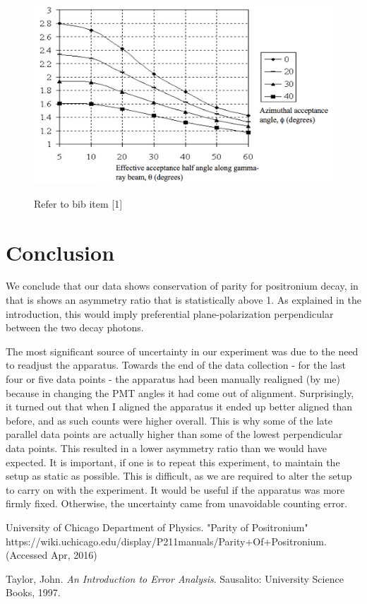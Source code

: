 \documentclass{article}
\begin{document}
\begin{figure}[!htb]
	\centering
	\includegraphics[scale=.2]{Fig_6.png}
 	\label{graph}
	\caption{Refer to bib item [1]}
\end{figure}

\newpage

\section{Conclusion}

We conclude that our data shows conservation of parity for positronium decay, in that is shows an asymmetry ratio that is statistically above 1. As explained in the introduction, this would imply preferential plane-polarization perpendicular between the two decay photons.

\hspace{.25cm}

The most significant source of uncertainty in our experiment was due to the need to readjust the apparatus. Towards the end of the data collection - for the last four or five data points - the apparatus had been manually realigned (by me) because in changing the PMT angles it had come out of alignment. Surprisingly, it turned out that when I aligned the apparatus it ended up better aligned than before, and as such counts were higher overall. This is why some of the late parallel data points are actually higher than some of the lowest perpendicular data points. This resulted in a lower asymmetry ratio than we would have expected. It is important, if one is to repeat this experiment, to maintain the setup as static as possible. This is difficult, as we are required to alter the setup to carry on with the experiment. It would be useful if the apparatus was more firmly fixed. Otherwise, the uncertainty came from unavoidable counting error.


\begin{thebibliography}{10}

		University of Chicago Department of Physics. "Parity of Positronium"\\
		https://wiki.uchicago.edu/display/P211manuals/Parity+Of+Positronium. (Accessed Apr, 2016)

		Taylor, John. \emph{An Introduction to Error Analysis}. Sausalito: University Science Books, 1997.
		
\end{thebibliography}
\end{document}
